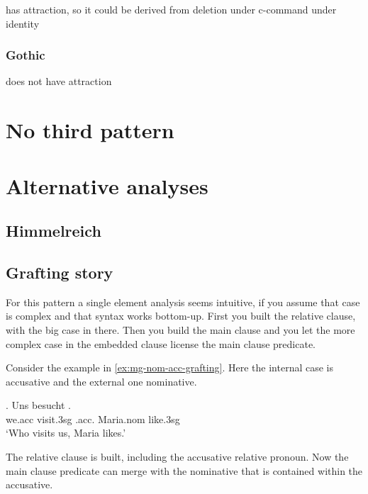 has attraction, so it could be derived from deletion under c-command under identity

\subsubsection{Gothic}

does not have attraction



\section{No third pattern}





\section{Alternative analyses}

\subsection{Himmelreich}



\subsection{Grafting story}

For this pattern a single element analysis seems intuitive, if you assume that case is complex and that syntax works bottom-up. First you built the relative clause, with the big case in there. Then you build the main clause and you let the more complex case in the embedded clause license the main clause predicate.

Consider the example in \ref{ex:mg-nom-acc-grafting}. Here the internal case is accusative and the external one nominative.

\exg. Uns besucht   .\\
 we.\ac{acc} visit.3\ac{sg}\scsub{[nom]} .\ac{acc}. Maria.\ac{nom} like.3\ac{sg}\scsub{[acc]}\\
 `Who visits us, Maria likes.' \label{ex:mg-nom-acc-grafting}

The relative clause is built, including the accusative relative pronoun. Now the main clause predicate can merge with the nominative that is contained within the accusative.

